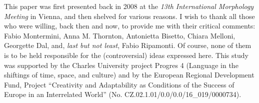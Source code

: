 \documentclass[output=paper]{langsci/langscibook}
\begin{document}
This paper was first presented back in
  2008 at the \emph{13th International Morphology Meeting} in Vienna,
  and then shelved for various reasons. I wish to thank all those who
  were willing, back then and now, to provide me with their critical
  comments: Fabio Montermini, Anna M. Thornton, Antonietta Bisetto,
  Chiara Melloni, Georgette Dal, and, \emph{last but not least}, Fabio
  Ripamonti. Of course, none of them is to be held responsible for the
  (controversial) ideas expressed here. This study was supported by the 
  Charles University project Progres 4 (Language in the shiftings of time, 
  space, and culture) and by the European Regional Development Fund, Project 
  ``Creativity and Adaptability as Conditions of the Success of Europe in 
  an Interrelated World'' (No. CZ.02.1.01/0.0/0.0/16\_019/0000734).




{\sloppy
    \printbibliography[heading=subbibliography,notkeyword=this]
}
\end{document}
